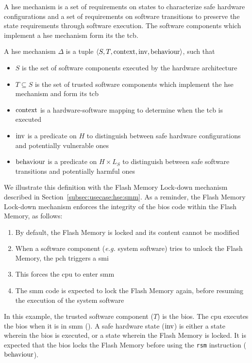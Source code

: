A \ac{hse} mechanism is a set of requirements on states to characterize safe
hardware configurations and a set of requirements on software transitions to
preserve the state requirements through software execution.
%
The software components which implement a \ac{hse} mechanism form its the
\ac{tcb}.

\begin{definition}
  \label{def:speccert:hse}
  A \ac{hse} mechanism $\Delta$ is a tuple
  $\langle S, T, \mathrm{context}, \mathrm{inv}, \mathrm{behaviour} \rangle$, such
  that
  \begin{itemize}
  \item $S$ is the set of software components executed by the hardware
    architecture
  \item $T \subseteq S$ is the set of trusted software components which
    implement the \ac{hse} mechanism and form its \ac{tcb}
  \item $\mathrm{context}$ is a hardware-software mapping to determine when the
    \ac{tcb} is executed
  \item $\mathrm{inv}$ is a predicate on $H$ to distinguish between safe hardware
    configurations and potentially vulnerable ones
  \item $\mathrm{behaviour}$ is a predicate on $H \times L_S$ to distinguish
    between safe software transitions and potentially harmful ones
  \end{itemize}
\end{definition}

We illustrate this definition with the Flash Memory Lock-down mechanism
described in Section~\ref{subsec:usecase:hse:smm}.
%
As a reminder, the Flash Memory Lock-down mechanism enforces the integrity of
the \ac{bios} code within the Flash Memory, as follows:
%
\begin{enumerate}
\item By default, the Flash Memory is locked and its content cannot be modified
%
\item When a software component (\emph{e.g.} system software) tries to unlock
  the Flash Memory, the \ac{pch} triggers a \ac{smi}
%
\item This forces the \ac{cpu} to enter \ac{smm}
%
\item The \ac{smm} code is expected to lock the Flash Memory again, before
  resuming the execution of the system software
\end{enumerate}

\begin{example}
  \label{example:speccert:flashdef}
  In this example, the trusted software component ($T$) is the \ac{bios}.
  The \ac{cpu} executes the \ac{bios} when it is in \ac{smm} ().
  A safe hardware state ($\mathrm{inv}$) is either a state wherein the \ac{bios}
  is executed, or a state wherein the Flash Memory is locked.
  It is expected that the \ac{bios} locks the Flash Memory before using the
  \texttt{rsm} instruction ($\mathrm{behaviour}$).
\end{example}

